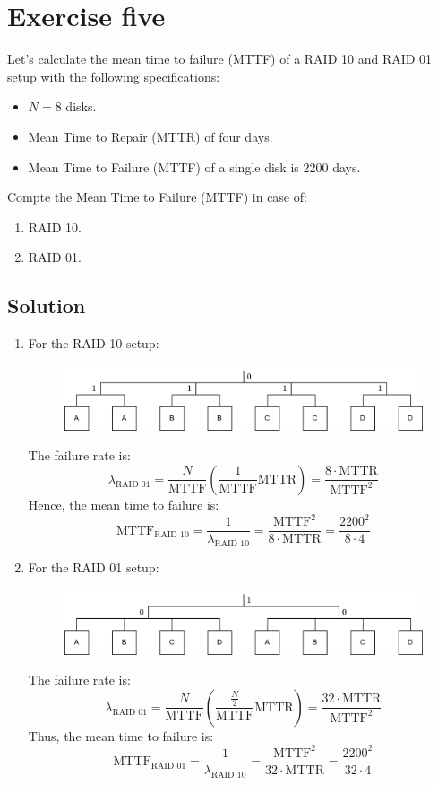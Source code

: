 \section{Exercise five}

Let's calculate the mean time to failure (MTTF) of a RAID 10 and RAID 01 setup with the following specifications:
\begin{itemize}
    \item $N=8$ disks.
    \item Mean Time to Repair (MTTR) of four days.
    \item Mean Time to Failure (MTTF) of a single disk is 2200 days.
\end{itemize}
Compte the Mean Time to Failure (MTTF) in case of:
\begin{enumerate}
    \item RAID 10. 
    \item RAID 01. 
\end{enumerate}

\subsection*{Solution}
\begin{enumerate}
    \item For the RAID 10 setup:
        \begin{figure}[H]
            \centering
            \includegraphics[width=0.75\linewidth]{images/510.png}
        \end{figure}
        The failure rate is:
        \[\lambda_{\text{RAID 01}}=\dfrac{N}{\text{MTTF}}\left(\dfrac{1}{\text{MTTF}}\text{MTTR}\right)=\dfrac{8\cdot\text{MTTR}}{\text{MTTF}^2}\]
        Hence, the mean time to failure is:
        \[\text{MTTF}_{\text{RAID 10}}=\dfrac{1}{\lambda_{\text{RAID 10}}}=\dfrac{\text{MTTF}^2}{8\cdot\text{MTTR}}=\dfrac{2200^2}{8\cdot 4}\]
    \item For the RAID 01 setup:
        \begin{figure}[H]
            \centering
            \includegraphics[width=0.75\linewidth]{images/501.png}
        \end{figure}
        The failure rate is:
        \[\lambda_{\text{RAID 01}}=\dfrac{N}{\text{MTTF}}\left(\dfrac{\frac{N}{2}}{\text{MTTF}}\text{MTTR}\right)=\dfrac{32\cdot\text{MTTR}}{\text{MTTF}^2}\]
        Thus, the mean time to failure is:
        \[\text{MTTF}_{\text{RAID 01}}=\dfrac{1}{\lambda_{\text{RAID 10}}}=\dfrac{\text{MTTF}^2}{32\cdot\text{MTTR}}=\dfrac{2200^2}{32\cdot 4}\]
\end{enumerate}